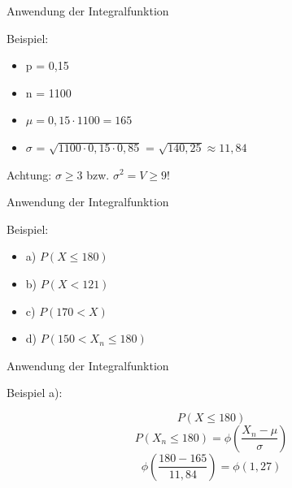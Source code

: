 \documentclass[14pt]{beamer}
\begin{document}
\begin{frame} {Anwendung der Integralfunktion}

Beispiel:
\begin{itemize}
 \item p = 0,15
 \item n = 1100
 \item $\mu = 0,15 \cdot 1100 = 165 $
 \item $\sigma$ = $\sqrt{1100 \cdot 0,15 \cdot 0,85}$ = $\sqrt{140,25} \approx 11,84$ 
\end{itemize}
 Achtung: $\sigma \ge 3$ bzw. $\sigma^2 = V \ge 9$!

\end{frame}

\begin{frame} {Anwendung der Integralfunktion}

Beispiel:
\begin{itemize}
 \item a) $P(X \le 180)$
 \item b) $P(X < 121)$
 \item c) $P(170 < X)$
 \item d) $P(150 < X_n \le 180)$
\end{itemize}

\end{frame}

\begin{frame} {Anwendung der Integralfunktion}

Beispiel a):
 
 $$P(X\le180)$$
 $$P(X_n \le 180) =  \phi\left(\frac{X_n - \mu}{\sigma}\right)$$
 $$ \phi(\frac{180 - 165}{11,84}) = \phi(1,27) $$

\end{frame}
\end{document}
